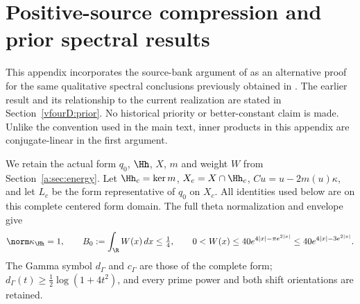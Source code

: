 \section{Positive-source compression and prior spectral results}\label{vfourD:section}
This appendix incorporates the source-bank argument of \cite{vfourSourceCompression} as an alternative proof for the same qualitative spectral conclusions previously obtained in \cite{vfourSchubr}. The earlier result and its relationship to the current realization are stated in Section~\ref{vfourD:prior}. No historical priority or better-constant claim is made. Unlike the convention used in the main text, inner products in this appendix are conjugate-linear in the first argument.

We retain the actual form $q_0$, $\Hh$, $X$, $m$ and weight $W$ from Section~\ref{a:sec:energy}. Let $\Hh_c=\ker m$, $X_c=X\cap\Hh_c$, $C u=u-2m(u)\kappa$, and let $L_c$ be the form representative of $q_0$ on $X_c$. All identities used below are on this complete centered form domain. The full theta normalization and envelope give
\begin{equation}\label{vfourD:Wbound}
 \norm\kappa_{\Hh}=1,\qquad B_0:=\int_\R W(x)\,dx\le\tfrac14,\qquad
 0<W(x)\le40e^{4|x|-\pi e^{2|x|}}\le40e^{4|x|-3e^{2|x|}}.
\end{equation}
The Gamma symbol $d_\Gamma$ and $c_\Gamma$ are those of the complete form; $d_\Gamma(t)\ge\frac12\log(1+4t^2)$, and every prime power and both shift orientations are retained.

